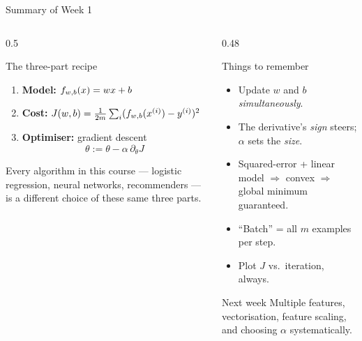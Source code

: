 \documentclass[aspectratio=169,10pt]{beamer}
\begin{document}
\begin{frame}{Summary of Week 1}
  \small
  \begin{columns}[T,onlytextwidth]
    \begin{column}{0.5\textwidth}
      \begin{block}{The three-part recipe}
        \begin{enumerate}
          \item \textbf{Model:} $f_{w,b}(x)=wx+b$
          \item \textbf{Cost:} $J(w,b)=\frac{1}{2m}\sum_i(f_{w,b}(x^{(i)})-y^{(i)})^2$
          \item \textbf{Optimiser:} gradient descent
            \[ \theta := \theta - \alpha\,\partial_\theta J \]
        \end{enumerate}
        Every algorithm in this course --- logistic regression, neural networks,
        recommenders --- is a different choice of these same three parts.
      \end{block}
    \end{column}
    \begin{column}{0.48\textwidth}
      \begin{block}{Things to remember}
        \begin{itemize}
          \item Update $w$ and $b$ \emph{simultaneously}.
          \item The derivative's \emph{sign} steers; $\alpha$ sets the \emph{size}.
          \item Squared-error + linear model $\Rightarrow$ convex $\Rightarrow$
                global minimum guaranteed.
          \item ``Batch'' = all $m$ examples per step.
          \item Plot $J$ vs.\ iteration, always.
        \end{itemize}
      \end{block}
      \begin{block}{Next week}
        \small Multiple features, vectorisation, feature scaling, and choosing
        $\alpha$ systematically.
      \end{block}
    \end{column}
  \end{columns}
\end{frame}
\end{document}
